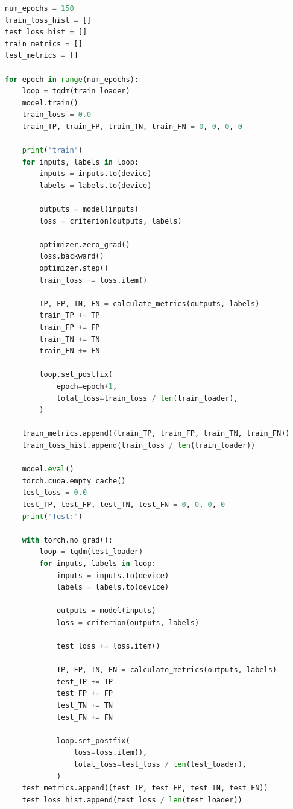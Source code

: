 \documentclass{article}
\begin{document}
\begin{LTR}
	\begin{lstlisting}[language=Python, caption=حلقه آموزش]
num_epochs = 150
train_loss_hist = []
test_loss_hist = []
train_metrics = []
test_metrics = []

for epoch in range(num_epochs):
    loop = tqdm(train_loader)
    model.train()
    train_loss = 0.0
    train_TP, train_FP, train_TN, train_FN = 0, 0, 0, 0

    print("train")
    for inputs, labels in loop:
        inputs = inputs.to(device)
        labels = labels.to(device)
        
        outputs = model(inputs)
        loss = criterion(outputs, labels)

        optimizer.zero_grad()
        loss.backward()
        optimizer.step()
        train_loss += loss.item()

        TP, FP, TN, FN = calculate_metrics(outputs, labels)
        train_TP += TP
        train_FP += FP
        train_TN += TN
        train_FN += FN
        
        loop.set_postfix(
            epoch=epoch+1,
            total_loss=train_loss / len(train_loader),
        )
    
    train_metrics.append((train_TP, train_FP, train_TN, train_FN))
    train_loss_hist.append(train_loss / len(train_loader))
    
    model.eval()
    torch.cuda.empty_cache()
    test_loss = 0.0
    test_TP, test_FP, test_TN, test_FN = 0, 0, 0, 0
    print("Test:")
    
    with torch.no_grad():
        loop = tqdm(test_loader)
        for inputs, labels in loop:
            inputs = inputs.to(device)
            labels = labels.to(device)

            outputs = model(inputs)
            loss = criterion(outputs, labels)
            
            test_loss += loss.item()
            
            TP, FP, TN, FN = calculate_metrics(outputs, labels)
            test_TP += TP
            test_FP += FP
            test_TN += TN
            test_FN += FN
            
            loop.set_postfix(
                loss=loss.item(),
                total_loss=test_loss / len(test_loader),
            )
    test_metrics.append((test_TP, test_FP, test_TN, test_FN))
    test_loss_hist.append(test_loss / len(test_loader))
	\end{lstlisting}
\end{LTR}
\end{document}
